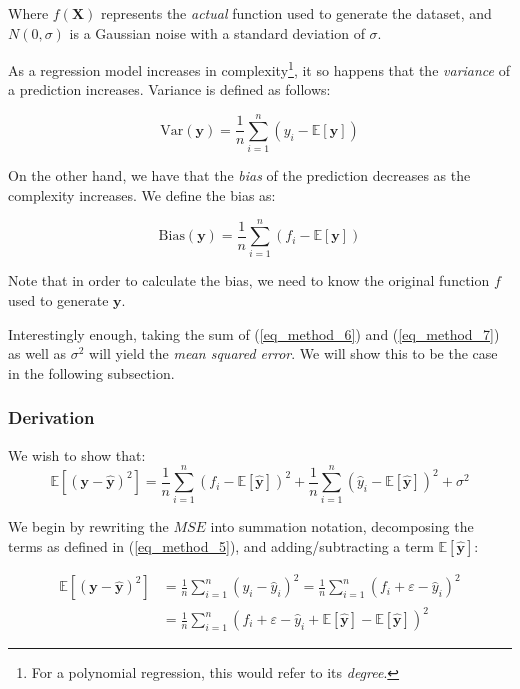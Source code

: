 \documentclass[a4paper,10pt,english]{article}
\begin{document}
	Where $f(\mathbf{X})$ represents the \textit{actual} function used to generate the dataset, and $N(0,\sigma)$ is a Gaussian noise with a standard deviation of $\sigma$.
	
	As a regression model increases in complexity\footnote{For a polynomial regression, this would refer to its \textit{degree}.}, it so happens that the \textit{variance} of a prediction increases.  Variance is defined as follows:
	
	\begin{equation}
	\label{eq_method_6}
	\text{Var}(\mathbf{y}) = \frac{1}{n} \sum_{i=1}^{n} (y_i - \mathbb{E}[\mathbf{y}] )
	\end{equation}
	
	On the other hand, we have that the \textit{bias} of the prediction decreases as the complexity increases.  We define the bias as:
	
	\begin{equation}
	\label{eq_method_7}
	\text{Bias}(\mathbf{y}) = \frac{1}{n} \sum_{i=1}^{n} (f_i - \mathbb{E}[\mathbf{y}] )
	\end{equation}
	
	Note that in order to calculate the bias, we need to know the original function $f$ used to generate $\mathbf{y}$.
	
	Interestingly enough, taking the sum of (\ref{eq_method_6}) and (\ref{eq_method_7}) as well as $\sigma^2$ will yield the \textit{mean squared error}.  We will show this to be the case in the following subsection.
	
	\subsubsection*{Derivation}

	We wish to show that:
	\begin{equation}
	\label{eq_method_8}
	\mathbb{E}\left[(\mathbf{y}-\hat{\mathbf{y}})^{2}\right]
	=\frac{1}{n} \sum_{i=1}^{n}(f_{i}-\mathbb{E}[\hat{\mathbf{y}}])^{2}+\frac{1}{n} \sum_{i=1}^{n}(\hat{y}_{i}-\mathbb{E}[\hat{\mathbf{y}}])^{2}+\sigma^{2}
	\end{equation}
	
	We begin by rewriting the $MSE$ into summation notation, decomposing the terms as defined in (\ref{eq_method_5}), and adding/subtracting a term $\mathbb{E}[\hat{\mathbf{y}}]$:
	
	\begin{align*}
	 \mathbb{E}\left[(\mathbf{y}-\hat{\mathbf{y}})^{2}\right] &= \frac{1}{n} \sum_{i=1}^{n} ( y_i - \hat{y}_i )^2 = \frac{1}{n} \sum_{i=1}^{n} ( f_i + \varepsilon - \hat{y}_i )^2 \\
	&= \frac{1}{n} \sum_{i=1}^{n} ( f_i + \varepsilon - \hat{y}_i  + \mathbb{E}[\hat{\mathbf{y}}] - \mathbb{E}[\hat{\mathbf{y}}] )^2
	\end{align*}
		
\end{document}
